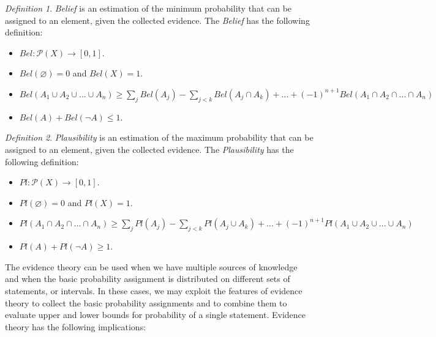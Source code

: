 \documentclass[12pt, a4paper]{report}
\theoremstyle{remark}
\newtheorem*{remark}{Definition}
\begin{document}
    \begin{remark}
        \emph{Belief} is an estimation of the minimum probability that can be assigned to an element, given the collected evidence. The 
        \emph{Belief} has the following definition:
        \begin{itemize}
            \item $Bel:\mathcal{P} (X) \rightarrow [0,1]$.
            \item $Bel(\varnothing)=0$ and $Bel(X)=1$.
            \item $Bel(A_1 \cup A_2 \cup \dots \cup A_n) \geq \sum_{j}Bel(A_j)-\sum_{j<k}Bel(A_j \cap A_k)+\dots+(-1)^{n+1}Bel(A_1 \cap A_2 \cap \dots \cap A_n)$
            \item $Bel(A)+Bel(\lnot A) \leq 1$.
        \end{itemize}
    \end{remark}
    \begin{remark}
        \emph{Plausibility} is an estimation of the maximum probability that can be assigned to an element, given the collected evidence.
        The \emph{Plausibility} has the following definition:
        \begin{itemize}
            \item $Pl:\mathcal{P} (X) \rightarrow [0,1]$.
            \item $Pl(\varnothing)=0$ and $Pl(X)=1$.
            \item $Pl(A_1 \cap A_2 \cap \dots \cap A_n) \geq \sum_{j}Pl(A_j)-\sum_{j<k}Pl(A_j \cup A_k)+\dots+(-1)^{n+1}Pl(A_1 \cup A_2 \cup \dots \cup A_n)$
            \item $Pl(A)+Pl(\lnot A) \geq 1$.
        \end{itemize}
    \end{remark}
    The evidence theory can be used when we have multiple sources of knowledge and when the basic probability assignment is distributed on 
    different sets of statements, or intervals. In these cases, we may exploit the features of evidence theory to collect the basic probability
    assignments and to combine them to evaluate upper and lower bounds for probability of a single statement. Evidence theory has the following 
    implications: 
\end{document}
